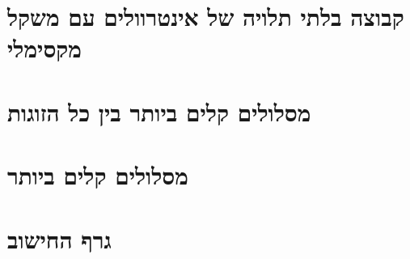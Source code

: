\documentclass[]{article}
\begin{document}
	



\section*{קבוצה בלתי תלויה של אינטרוולים עם משקל מקסימלי}

\section*{מסלולים קלים ביותר בין כל הזוגות}

\section*{מסלולים קלים ביותר}

\section*{גרף החישוב}
\end{document}
